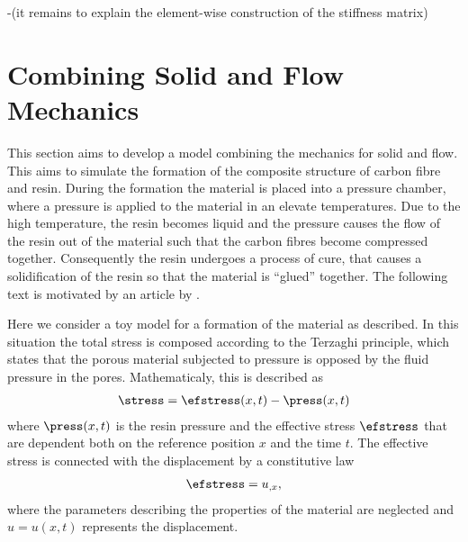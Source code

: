 \documentclass[twoside,a4paper,12pt]{article}
\newcommand{\note}[1]{{\color{red}(#1)}}
\begin{document}
-\note{it remains to explain the element-wise construction of the stiffness matrix}

\section{Combining Solid and Flow Mechanics}

This section aims to develop a model combining the mechanics for solid
and flow. This aims to simulate the formation of the composite
structure of carbon fibre and resin. During the formation the material
is placed into a pressure chamber, where a pressure is applied to the
material in an elevate temperatures. Due to the high temperature, the
resin becomes liquid and the pressure causes the flow of the resin out
of the material such that the carbon fibres become compressed
together. Consequently the resin undergoes a process of cure, that
causes a solidification of the resin so that the material is ``glued''
together. The following text is motivated by an article by
\citet{Hubert1999}.

Here we consider a toy model for a formation of the material as
described.  In this situation the total stress is composed according
to the Terzaghi principle, which states that the porous material
subjected to pressure is opposed by the fluid pressure in the
pores. Mathematicaly, this is described as
%
\begin{align}
\stress = \efstress(x,t) - \press(x,t) \label{eq:flow-stress}
\end{align}
%
where $\press(x,t)$ is the resin pressure and the effective stress
$\efstress$ that are dependent both on the reference position $x$ and
the time $t$. The effective stress is connected with the
displacement by a constitutive law
\begin{align}
\efstress = u_{,x},
\end{align}
%
where the parameters describing the properties of the material are
neglected and $u= u(x,t)$ represents the displacement.
\end{document}
